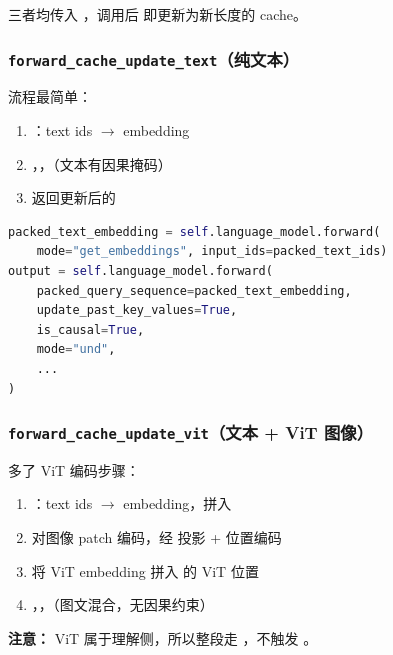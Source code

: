三者均传入 ，调用后  即更新为新长度的 cache。

\subsubsection{\texttt{forward\_cache\_update\_text}（纯文本）}

流程最简单：

\begin{enumerate}[leftmargin=1.5em]
  \item {}：text ids $\to$ embedding
  \item {}，，（文本有因果掩码）
  \item 返回更新后的 
\end{enumerate}

\begin{lstlisting}[language=Python]
packed_text_embedding = self.language_model.forward(
    mode="get_embeddings", input_ids=packed_text_ids)
output = self.language_model.forward(
    packed_query_sequence=packed_text_embedding,
    update_past_key_values=True,
    is_causal=True,
    mode="und",
    ...
)
\end{lstlisting}

\subsubsection{\texttt{forward\_cache\_update\_vit}（文本 + ViT 图像）}

多了 ViT 编码步骤：

\begin{enumerate}[leftmargin=1.5em]
  \item {}：text ids $\to$ embedding，拼入 
  \item {} 对图像 patch 编码，经  投影 + 位置编码
  \item 将 ViT embedding 拼入  的 ViT 位置
  \item {}，，（图文混合，无因果约束）
\end{enumerate}

\begin{intubox}
\textbf{注意：} ViT 属于理解侧，所以整段走 ，不触发 。
\end{intubox}

